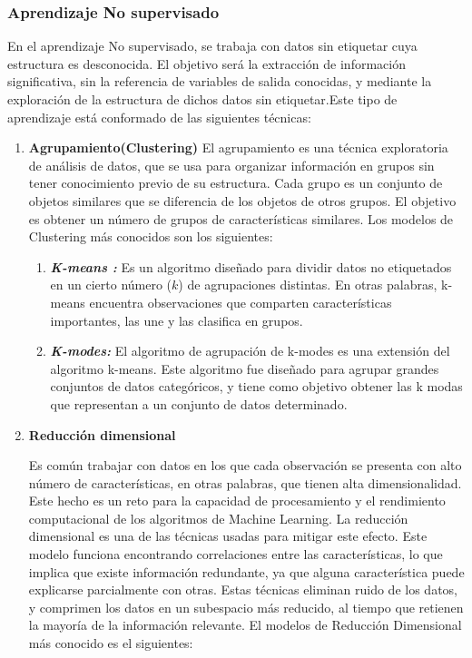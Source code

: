 \subsubsection{Aprendizaje No supervisado}
En el aprendizaje No supervisado, se trabaja con datos sin etiquetar cuya estructura es desconocida. El objetivo será la extracción de información significativa, sin la referencia de variables de salida conocidas, y mediante la exploración de la estructura de dichos datos sin etiquetar\cite{BriegaLopez2015}.Este tipo de aprendizaje está conformado de las siguientes técnicas:
\begin{enumerate}[label=\textbf{\arabic*})]
	
	\item \textbf{Agrupamiento(Clustering)}
	El agrupamiento es una técnica exploratoria de análisis de datos, que se usa para organizar información en grupos sin tener conocimiento previo de su estructura. Cada grupo es un conjunto de objetos similares que se diferencia de los objetos de otros grupos. El objetivo es obtener un número de grupos de características similares\cite{BriegaLopez2015}. Los modelos de Clustering más conocidos son los siguientes:
	
	\begin{enumerate}[label=\textbf{(\alph*)}]
		\item \textit{\textbf{K-means :}}
		Es un algoritmo diseñado para dividir datos no etiquetados en un cierto número ($k$) de agrupaciones distintas. En otras palabras, k-means encuentra observaciones que comparten características importantes, las une y las clasifica en grupos\cite{Jeffares2019}. 
		
		\item \textit{\textbf{K-modes:}}
		El algoritmo de agrupación de k-modes es una extensión del algoritmo k-means. Este algoritmo fue diseñado para agrupar grandes conjuntos de datos categóricos, y tiene como objetivo obtener las k modas que representan a un conjunto de datos determinado\cite{Ramirez2020}.
	\end{enumerate}
	
	\item \textbf{Reducción dimensional}
	
	Es común trabajar con datos en los que cada observación se presenta con alto número de características, en otras palabras, que tienen alta dimensionalidad. Este hecho es un reto para la capacidad de procesamiento y el rendimiento computacional de los algoritmos de Machine Learning. La reducción dimensional es una de las técnicas usadas para mitigar este efecto. Este modelo funciona encontrando correlaciones entre las características, lo que implica que existe información redundante, ya que alguna característica puede explicarse parcialmente con otras. Estas técnicas eliminan ruido de los datos, y comprimen los datos en un subespacio más reducido, al tiempo que retienen la mayoría de la información relevante\cite{BriegaLopez2015}. El modelos de Reducción Dimensional más conocido es el siguientes:
	

\end{enumerate}
